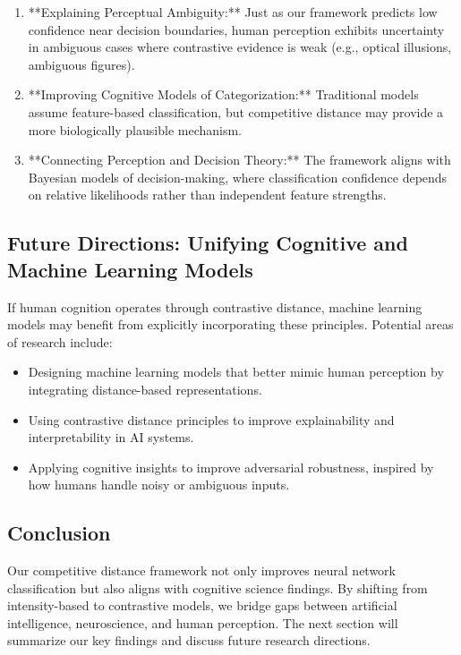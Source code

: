 \begin{enumerate}
    \item **Explaining Perceptual Ambiguity:** Just as our framework predicts low confidence near decision boundaries, human perception exhibits uncertainty in ambiguous cases where contrastive evidence is weak (e.g., optical illusions, ambiguous figures).
    \item **Improving Cognitive Models of Categorization:** Traditional models assume feature-based classification, but competitive distance may provide a more biologically plausible mechanism.
    \item **Connecting Perception and Decision Theory:** The framework aligns with Bayesian models of decision-making, where classification confidence depends on relative likelihoods rather than independent feature strengths.
\end{enumerate}

\subsection{Future Directions: Unifying Cognitive and Machine Learning Models}

If human cognition operates through contrastive distance, machine learning models may benefit from explicitly incorporating these principles. Potential areas of research include:

\begin{itemize}
    \item Designing machine learning models that better mimic human perception by integrating distance-based representations.
    \item Using contrastive distance principles to improve explainability and interpretability in AI systems.
    \item Applying cognitive insights to improve adversarial robustness, inspired by how humans handle noisy or ambiguous inputs.
\end{itemize}

\subsection{Conclusion}

Our competitive distance framework not only improves neural network classification but also aligns with cognitive science findings. By shifting from intensity-based to contrastive models, we bridge gaps between artificial intelligence, neuroscience, and human perception. The next section will summarize our key findings and discuss future research directions.
